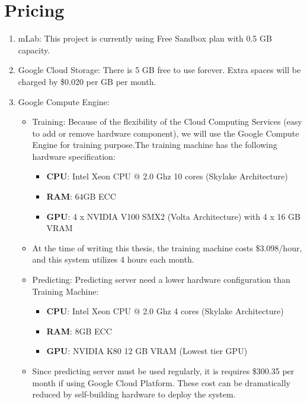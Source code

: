 \section{Pricing}
\begin{enumerate}
	\item mLab: This project is currently using Free Sandbox plan with 0.5 GB capacity.
	\item Google Cloud Storage: There is 5 GB free to use forever. Extra spaces will be charged by \$0.020 per GB per month.
	\item Google Compute Engine:
		\begin{itemize}
			\item Training: Because of the flexibility of the Cloud Computing Services (easy to add or remove hardware component), we will use the Google Compute Engine for training purpose.The training machine has the following hardware specification:
			 \begin{itemize}
			 	\item \textbf{CPU}: Intel Xeon CPU @ 2.0 Ghz 10 cores (Skylake Architecture)
			 	\item \textbf{RAM}: 64GB ECC
			 	\item \textbf{GPU}: 4 x NVIDIA V100 SMX2 (Volta Architecture) with 4 x 16 GB VRAM
			 \end{itemize}
			 \item At the time of writing this thesis, the training machine costs \$3.098/hour, and this system utilizes 4 hours each month. 
			\item Predicting: Predicting server need a lower hardware configuration than Training Machine:
			\begin{itemize}
				\item \textbf{CPU}: Intel Xeon CPU @ 2.0 Ghz 4 cores (Skylake Architecture)
				\item \textbf{RAM}: 8GB ECC
				\item \textbf{GPU}: NVIDIA K80 12 GB VRAM (Lowest tier GPU)
			\end{itemize}
			\item Since predicting server must be used regularly, it is requires \$300.35 per month if using Google Cloud Platform. These cost can be dramatically reduced by self-building hardware to deploy the system.
		\end{itemize}
\end{enumerate}
